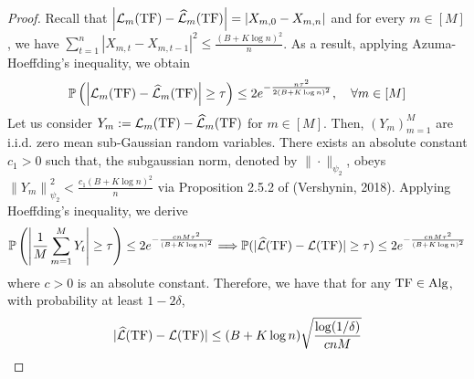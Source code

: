 \begin{proof}
Recall that $\left|\mathcal{L}_m(\mathrm{TF})-\widehat{\mathcal{L}}_m(\mathrm{TF})\right|=\left|X_{m, 0}-X_{m, n}\right|$ and for every $m \in[M]$, we have $\sum_{t=1}^n\left|X_{m, t}-X_{m, t-1}\right|^2 \leq \frac{(B+K \log n)^2}{n}$. As a result, applying Azuma-Hoeffding's inequality, we obtain
\begin{align}
    \mathbb{P}\left(\left|\mathcal{L}_m(\mathrm{TF})-\widehat{\mathcal{L}}_m(\mathrm{TF})\right| \geq \tau\right) \leq 2 e^{-\frac{n \tau^2}{2(B+K \log n)^2}}, \quad \forall m \in[M]  \label{eq:azuma}
\end{align}
Let us consider $Y_m:=\mathcal{L}_m(\mathrm{TF})-\widehat{\mathcal{L}}_m(\mathrm{TF})$ for $m \in[M]$. Then, $\left(Y_m\right)_{m=1}^M$ are i.i.d. zero mean sub-Gaussian random variables. There exists an absolute constant $c_1>0$ such that, the subgaussian norm, denoted by $\|\cdot\|_{\psi_2}$, obeys $\left\|Y_m\right\|_{\psi_2}^2<\frac{c_1(B+K \log n)^2}{n}$ via Proposition 2.5.2 of (Vershynin, 2018). Applying Hoeffding's inequality, we derive
\begin{align*}
    \mathbb{P}\left(\left|\frac{1}{M} \sum_{m=1}^M Y_t\right| \geq \tau\right) \leq 2 e^{-\frac{c n M \tau^2}{(B+K \log n)^2}} \Longrightarrow \mathbb{P}(|\widehat{\mathcal{L}}(\mathrm{TF})-\mathcal{L}(\mathrm{TF})| \geq \tau) \leq 2 e^{-\frac{c n M \tau^2}{(B+K \log n)^2}}
\end{align*}
where $c>0$ is an absolute constant. Therefore, we have that for any $\mathrm{TF} \in \mathrm{Alg}$, with probability at least $1-2 \delta$,
\begin{align}
    |\widehat{\mathcal{L}}(\mathrm{TF})-\mathcal{L}(\mathrm{TF})| \leq(B+K \log n) \sqrt{\frac{\log (1 / \delta)}{c n M}} \label{eq:conc-bound}
\end{align}



\end{proof}
